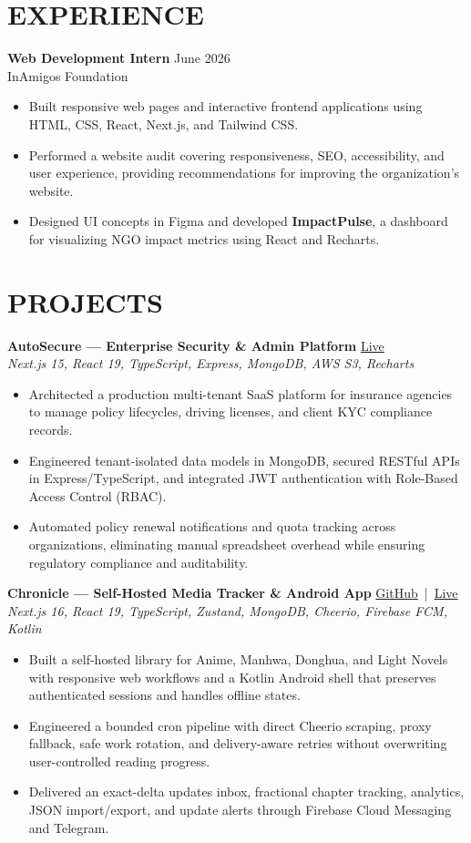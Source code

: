 \documentclass[letterpaper,11pt]{article}
\newcommand{\resumeItem}[1]{\item \small{#1}}
\newcommand{\resumeListStart}{\begin{itemize}[leftmargin=0.18in, itemsep=2pt, topsep=4pt]}
\newcommand{\resumeListEnd}{\end{itemize}\vspace{6pt}}
\newcommand{\projectTech}[1]{{\small\textit{#1}}}
\begin{document}
\vspace{8pt}

\section{EXPERIENCE}

\textbf{Web Development Intern} \hfill June 2026 \\
InAmigos Foundation
\resumeListStart
\resumeItem{Built responsive web pages and interactive frontend applications using HTML, CSS, React, Next.js, and Tailwind CSS.}
\resumeItem{Performed a website audit covering responsiveness, SEO, accessibility, and user experience, providing recommendations for improving the organization's website.}
\resumeItem{Designed UI concepts in Figma and developed \textbf{ImpactPulse}, a dashboard for visualizing NGO impact metrics using React and Recharts.}
\resumeListEnd

\section{PROJECTS}

\textbf{AutoSecure — Enterprise Security \& Admin Platform} \hfill \href{https://autosecure.vxdev.in}{Live} \\
\projectTech{Next.js 15, React 19, TypeScript, Express, MongoDB, AWS S3, Recharts}
\resumeListStart
\resumeItem{Architected a production multi-tenant SaaS platform for insurance agencies to manage policy lifecycles, driving licenses, and client KYC compliance records.}
\resumeItem{Engineered tenant-isolated data models in MongoDB, secured RESTful APIs in Express/TypeScript, and integrated JWT authentication with Role-Based Access Control (RBAC).}
\resumeItem{Automated policy renewal notifications and quota tracking across organizations, eliminating manual spreadsheet overhead while ensuring regulatory compliance and auditability.}
\resumeListEnd

\textbf{Chronicle — Self-Hosted Media Tracker \& Android App} \hfill \href{https://github.com/VortexDevX/Chronicle}{GitHub} \,|\, \href{https://chroniclex.vercel.app/}{Live} \\
\projectTech{Next.js 16, React 19, TypeScript, Zustand, MongoDB, Cheerio, Firebase FCM, Kotlin}
\resumeListStart
\resumeItem{Built a self-hosted library for Anime, Manhwa, Donghua, and Light Novels with responsive web workflows and a Kotlin Android shell that preserves authenticated sessions and handles offline states.}
\resumeItem{Engineered a bounded cron pipeline with direct Cheerio scraping, proxy fallback, safe work rotation, and delivery-aware retries without overwriting user-controlled reading progress.}
\resumeItem{Delivered an exact-delta updates inbox, fractional chapter tracking, analytics, JSON import/export, and update alerts through Firebase Cloud Messaging and Telegram.}
\resumeListEnd
\end{document}
